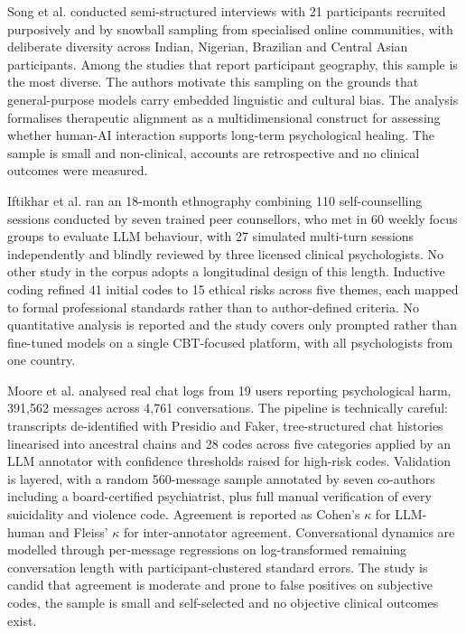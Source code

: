 \documentclass[11pt]{article}
\begin{document}
	Song et al.\cite{song2025typingcureexperienceslarge} conducted semi-structured interviews with 21 participants recruited purposively and by snowball sampling from specialised online communities, with deliberate diversity across Indian, Nigerian, Brazilian and Central Asian participants. Among the studies that report participant geography, this sample is the most diverse. The authors motivate this sampling on the grounds that general-purpose models carry embedded linguistic and cultural bias. The analysis formalises therapeutic alignment as a multidimensional construct for assessing whether human-AI interaction supports long-term psychological healing. The sample is small and non-clinical, accounts are retrospective and no clinical outcomes were measured.
	
	Iftikhar et al.\cite{Iftikhar2025HowLC} ran an 18-month ethnography combining 110 self-counselling sessions conducted by seven trained peer counsellors, who met in 60 weekly focus groups to evaluate LLM behaviour, with 27 simulated multi-turn sessions independently and blindly reviewed by three licensed clinical psychologists. No other study in the corpus adopts a longitudinal design of this length. Inductive coding refined 41 initial codes to 15 ethical risks across five themes, each mapped to formal professional standards rather than to author-defined criteria. No quantitative analysis is reported and the study covers only prompted rather than fine-tuned models on a single CBT-focused platform, with all psychologists from one country.
	
	Moore et al.\cite{moore2026characterizingdelusionalspiralshumanllm} analysed real chat logs from 19 users reporting psychological harm, 391,562 messages across 4,761 conversations. The pipeline is technically careful: transcripts de-identified with Presidio and Faker, tree-structured chat histories linearised into ancestral chains and 28 codes across five categories applied by an LLM annotator with confidence thresholds raised for high-risk codes. Validation is layered, with a random 560-message sample annotated by seven co-authors including a board-certified psychiatrist, plus full manual verification of every suicidality and violence code. Agreement is reported as Cohen's $\kappa$ for LLM-human and Fleiss' $\kappa$ for inter-annotator agreement. Conversational dynamics are modelled through per-message regressions on log-transformed remaining conversation length with participant-clustered standard errors. The study is candid that agreement is moderate and prone to false positives on subjective codes, the sample is small and self-selected and no objective clinical outcomes exist.
	
\end{document}
